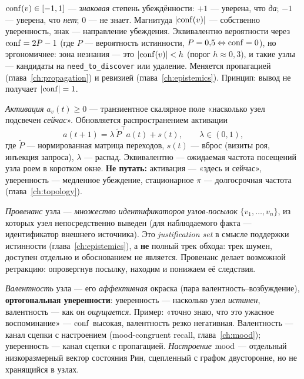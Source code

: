 \begin{definition}[Уверенность]
$\mathrm{conf}(v)\in[-1,1]$ — \emph{знаковая} степень убеждённости: $+1$ — уверена, что
\emph{да}; $-1$ — уверена, что \emph{нет}; $0$ — не знает. Магнитуда $|\mathrm{conf}(v)|$ —
собственно уверенность, знак — направление убеждения. Эквивалентно вероятности
через $\mathrm{conf}=2P-1$ (где $P$ — вероятность истинности, $P=0{,}5\Leftrightarrow
\mathrm{conf}=0$), но эргономичнее: зона незнания — это $|\mathrm{conf}(v)|<h$ (порог $h\approx
0{,}3$), и такие узлы — кандидаты на \texttt{need\_to\_discover} или удаление.
Меняется пропагацией (глава~\ref{ch:propagation}) и ревизией
(глава~\ref{ch:epistemics}). Принцип: вывод не получает $|\mathrm{conf}|=1$.
\end{definition}

\begin{definition}[Активация]
\emph{Активация} $a_v(t)\ge 0$ — транзиентное скалярное поле «насколько узел
подсвечен \emph{сейчас}». Обновляется распространением активации
\[
a(t{+}1)=\lambda\,\tilde P^{\top} a(t)+s(t),\qquad \lambda\in(0,1),
\]
где $\tilde P$ — нормированная матрица переходов, $s(t)$ — вброс (визиты роя,
инъекция запроса), $\lambda$ — распад. Эквивалентно — ожидаемая частота посещений
узла роем в коротком окне. \textbf{Не путать:} активация — «здесь и сейчас»,
уверенность — медленное убеждение, стационарное $\pi$ — долгосрочная частота
(глава~\ref{ch:topology}).
\end{definition}

\begin{definition}
\emph{Провенанс} узла — \emph{множество идентификаторов узлов-посылок}
$\{v_1,\dots,v_n\}$, из которых узел непосредственно выведен (для наблюдаемого факта
— идентификатор внешнего источника). Это \emph{justification set} в смысле
поддержки истинности (глава~\ref{ch:epistemics}), а \textbf{не} полный трек обхода:
трек шумен, доступен отдельно и обоснованием не является. Провенанс делает возможной
ретракцию: опровергнув посылку, находим и понижаем её следствия.
\end{definition}

\begin{definition}
\emph{Валентность} узла — его \emph{аффективная} окраска (пара
валентность–возбуждение), \textbf{ортогональная уверенности}: уверенность — насколько
узел \emph{истинен}, валентность — как он \emph{ощущается}. Пример: «точно знаю, что
это ужасное воспоминание» — $\mathrm{conf}$ высокая, валентность резко негативная.
Валентность — канал сцепки с настроением (mood-congruent recall,
глава~\ref{ch:mood}); уверенность — канал сцепки с пропагацией. \emph{Настроение}
$\mathrm{mood}$ — отдельный низкоразмерный вектор состояния Рин, сцепленный с графом
двусторонне, но не хранящийся в узлах.
\end{definition}

